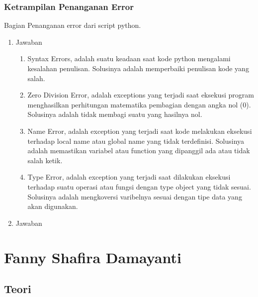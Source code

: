 \subsubsection{Ketrampilan Penanganan Error}
Bagian Penanganan error dari script python.
\begin{enumerate}
\item Jawaban
\begin{enumerate}
\item Syntax Errors, adalah suatu keadaan saat kode python mengalami kesalahan penulisan. Solusinya adalah memperbaiki penulisan kode yang salah.

\item Zero Division Error, adalah exceptions yang terjadi saat eksekusi program menghasilkan perhitungan matematika pembagian dengan angka nol (0). Solusinya adalah tidak membagi suatu yang hasilnya nol.

\item Name Error, adalah exception yang terjadi saat kode melakukan eksekusi terhadap local name atau global name yang tidak terdefinisi. Solusinya adalah memastikan variabel atau function yang dipanggil ada atau tidak salah ketik.

\item Type Error, adalah exception yang terjadi saat dilakukan eksekusi terhadap suatu operasi atau fungsi dengan type object yang tidak sesuai. Solusinya adalah mengkoversi varibelnya sesuai dengan tipe data yang akan digunakan.

\end{enumerate}
\item Jawaban																	

\end{enumerate}


\section{Fanny Shafira Damayanti}
\subsection{Teori}
